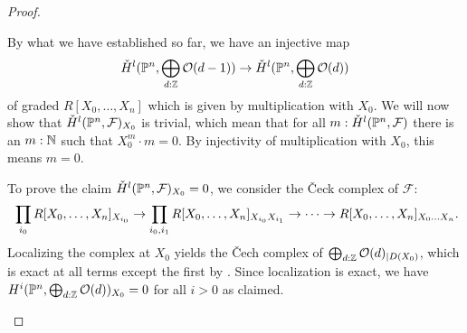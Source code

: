\begin{proof}
\begin{enumerate}[(i)]
    By what we have established so far, we have an injective map
    \[
      \check{H}^l(\mathbb{P}^n,\bigoplus_{d:\mathbb{Z}}\mathcal O(d-1))\to \check{H}^l(\mathbb{P}^n,\bigoplus_{d:\mathbb{Z}}\mathcal O(d))
    \]
    of graded $R[X_0,\dots,X_n]$ which is given by multiplication with $X_0$.
    We will now show that $\check{H}^l(\mathbb{P}^n,\mathcal F)_{X_0}$ is trivial, which mean that for all $m:\check{H}^l(\mathbb{P}^n,\mathcal F)$ there is an $m:\mathbb{N}$ such that $X_0^m\cdot m=0$. By injectivity of multiplication with $X_0$, this means $m=0$.
    
    To prove the claim $\check{H}^l(\mathbb{P}^n,\mathcal F)_{X_0}=0$, we consider the \v{C}eck complex of $\mathcal F$:
  \[
    \prod_{i_0}R[X_0,\dots,X_n]_{X_{i_0}} \to \prod_{i_0,i_1} R[X_0,\dots,X_n]_{X_{i_0} X_{i_1}} \to \dots \to R[X_0,\dots,X_n]_{X_0\dots X_n}
    \rlap{.}
  \]
  Localizing the complex at $X_0$ yields the \v{C}ech complex of $\bigoplus_{d:\mathbb{Z}}\mathcal O(d)_{\vert D(X_0)}$, which is exact at all terms except the first by .
  Since localization is exact, we have $H^i(\mathbb{P}^n,\bigoplus_{d:\mathbb{Z}}\mathcal O(d))_{X_0}=0$ for all $i>0$ as claimed.
  
  \end{enumerate}
\end{proof}
